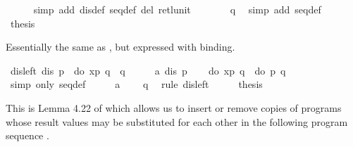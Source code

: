 \begin{isabellebody}
\ \ \ \ \isamarkupfalse%
\ {\isacharparenleft}simp\ add{\isacharcolon}\ dis{\isacharunderscore}def\ seq{\isacharunderscore}def\ del{\isacharcolon}\ ret{\isacharunderscore}lunit{\isacharparenright}\isanewline
\ \ \isamarkupfalse%
\ \isamarkupfalse%
\ {\isachardoublequote}{\isasymdots}\ {\isacharequal}\ q{\isachardoublequote}\ \isamarkupfalse%
\ {\isacharparenleft}simp\ add{\isacharcolon}\ seq{\isacharunderscore}def{\isacharparenright}\isanewline
\ \ \isamarkupfalse%
\ \isamarkupfalse%
\ {\isacharquery}thesis\ \isamarkupfalse%
\isacommand{{\isachardot}}\isanewline
\isamarkupfalse%
\isamarkupfalse%
%
\begin{isamarkuptext}%
Essentially the same as , but expressed
  with binding.%
\end{isamarkuptext}%
\isamarkuptrue%
\ dis{\isacharunderscore}left{}{\isacharcolon}\ {\isachardoublequote}dis\ p\ {\isasymLongrightarrow}\ do\ {\isacharbraceleft}x{\isasymleftarrow}p{\isacharsemicolon}\ q{\isacharbraceright}\ {\isacharequal}\ q{\isachardoublequote}\isanewline
\isamarkupfalse%
\ {\isacharminus}\isanewline
\ \ \isamarkupfalse%
\ a{\isacharcolon}\ {\isachardoublequote}dis\ p{\isachardoublequote}\isanewline
\ \ \isamarkupfalse%
\ {\isachardoublequote}do\ {\isacharbraceleft}x{\isasymleftarrow}p{\isacharsemicolon}\ q{\isacharbraceright}\ {\isacharequal}\ do\ {\isacharbraceleft}p{\isacharsemicolon}\ q{\isacharbraceright}{\isachardoublequote}\ \isamarkupfalse%
\ {\isacharparenleft}simp\ only{\isacharcolon}\ seq{\isacharunderscore}def{\isacharparenright}\isanewline
\ \ \isamarkupfalse%
\ \isamarkupfalse%
\ a\ \isamarkupfalse%
\ {\isachardoublequote}{\isasymdots}\ {\isacharequal}\ q{\isachardoublequote}\ \isamarkupfalse%
\ {\isacharparenleft}rule\ dis{\isacharunderscore}left{\isacharparenright}\isanewline
\ \ \isamarkupfalse%
\ \isamarkupfalse%
\ {\isacharquery}thesis\ \isamarkupfalse%
\isacommand{{\isachardot}}\isanewline
\isamarkupfalse%
\isamarkupfalse%
%
\begin{isamarkuptext}%
This is Lemma 4.22 of \cite{SchroederMossakowski:PDL} which allows us to insert or remove
  copies of  programs whose result values may be substituted for each other
  in the following program sequence .%

\end{isamarkuptext}
\end{isabellebody}
